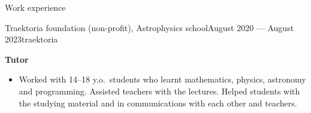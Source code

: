 \documentclass{resume} %
\newcommand{\subheader}[2]{
	{\textbf{#1}} \ifthenelse{\equal{#2}{}}{}{\timestamp{#2}}
}
\begin{document}
\begin{rSection}{Work experience}
		\vspace{1em}

		\begin{rSubsection}{Traektoria foundation (non-profit), Astrophysics school}{August 2020 --- August 2023}{}{}{traektoria}
			\item \subheader{Tutor}{}
			\begin{itemize}
				\item Worked with 14--18 y.o.\ students who learnt mathematics, physics, astronomy and programming. Assisted teachers with the lectures. Helped students with the studying material and in communications with each other and teachers.
			\end{itemize}
		\end{rSubsection}
    \end{rSection}
\end{document}
